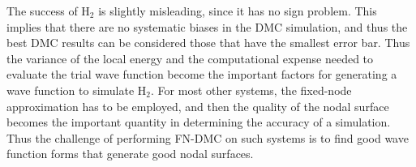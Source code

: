 \documentclass[aip,jcp,numerical,reprint]{revtex4-1}
\begin{document}
The success of H$_{2}$ is slightly misleading, since it has no sign problem.  This implies that there are no systematic biases in the DMC simulation, and thus the best DMC results can be considered those that have the smallest error bar.  Thus the variance of the local energy and the computational expense needed to evaluate the trial wave function become the important factors for generating a wave function to simulate H$_{2}$.  For most other systems, the fixed-node approximation has to be employed, and then the quality of the nodal surface becomes the important quantity in determining the accuracy of a simulation.  Thus the challenge of performing FN-DMC on such systems is to find good wave function forms that generate good nodal surfaces.

\end{document}
